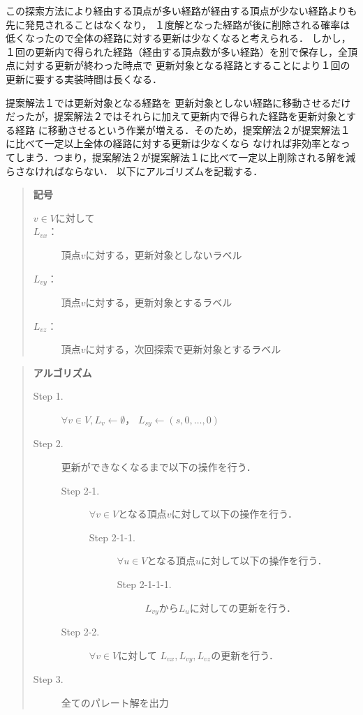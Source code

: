 \documentclass[12pt]{optlab-bachelor}
\begin{document}
この探索方法により経由する頂点が多い経路が経由する頂点が少ない経路よりも先に発見されることはなくなり，
１度解となった経路が後に削除される確率は低くなったので全体の経路に対する更新は少なくなると考えられる．
しかし，１回の更新内で得られた経路（経由する頂点数が多い経路）を別で保存し，全頂点に対する更新が終わった時点で
更新対象となる経路とすることにより１回の更新に要する実装時間は長くなる．

提案解法１では更新対象となる経路を
更新対象としない経路に移動させるだけだったが，提案解法２ではそれらに加えて更新内で得られた経路を更新対象とする経路
に移動させるという作業が増える．そのため，提案解法２が提案解法１に比べて一定以上全体の経路に対する更新は少なくなら
なければ非効率となってしまう．つまり，提案解法２が提案解法１に比べて一定以上削除される解を減らさなければならない．
以下にアルゴリズムを記載する．

\begin{quote}
  \textbf{記号}
  \begin{description}
    \item[$v \in V$に対して]
    \item[$L_{vx}$：] 頂点$v$に対する，更新対象としないラベル
    \item[$L_{vy}$：] 頂点$v$に対する，更新対象とするラベル
    \item[$L_{vz}$：] 頂点$v$に対する，次回探索で更新対象とするラベル
  \end{description}
\end{quote}

\begin{quote}
  \textbf{アルゴリズム}
  \begin{description}
    \item[Step 1.] $\forall v \in V , L_v \leftarrow \emptyset$，
    $L_{sy} \leftarrow (s,0,\ldots,0)$
    \item[Step 2.] 更新ができなくなるまで以下の操作を行う．
    \begin{description}
      \item[Step 2-1.] $\forall v \in V$となる頂点$v$に対して以下の操作を行う．
      \begin{description}
        \item[Step 2-1-1.] $\forall u \in V$となる頂点$u$に対して以下の操作を行う．
        \begin{description}
          \item[Step 2-1-1-1.] $L_{vy}$から$L_u$に対しての更新を行う．
        \end{description}
      \end{description}
      \item[Step 2-2.] $\forall v \in V$に対して
      $L_{vx},L_{vy},L_{vz}$の更新を行う．
    \end{description}
    \item[Step 3.] 全てのパレート解を出力
  \end{description}
\end{quote}
\end{document}
